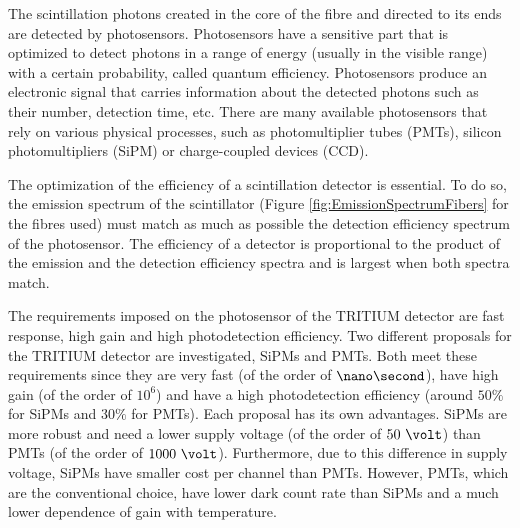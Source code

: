 The scintillation photons created in the core of the fibre and directed to its ends are detected by photosensors. Photosensors have a sensitive part that is optimized to detect photons in a range of energy (usually in the visible range) with a certain probability, called quantum efficiency. Photosensors produce an electronic signal that carries information about the detected photons such as their number, detection time, etc. There are many available photosensors that rely on various physical processes, such as photomultiplier tubes (PMTs), silicon photomultipliers (SiPM) or charge-coupled devices (CCD).  %

The optimization of the efficiency of a scintillation detector is essential. To do so, the emission spectrum of the scintillator (Figure \ref{fig:EmissionSpectrumFibers} for the fibres used) must match as much as possible the detection efficiency spectrum of the photosensor. The efficiency of a detector is proportional to the product of the emission and the detection efficiency spectra and is largest when both spectra match.

The requirements imposed on the photosensor of the TRITIUM detector are fast response, high gain and high photodetection efficiency. Two different proposals for the TRITIUM detector are investigated, SiPMs and PMTs. Both meet these requirements since they are very fast (of the order of $\nano\second$), have high gain (of the order of $10^{6}$) and have a high photodetection efficiency (around $50\%$ for SiPMs and $30\%$ for PMTs). Each proposal has its own advantages. SiPMs are more robust and need a lower supply voltage (of the order of $50~\volt$) than PMTs (of the order of $1000~\volt$). Furthermore, due to this difference in supply voltage, SiPMs have smaller cost per channel than PMTs. However, PMTs, which are the conventional choice, have lower dark count rate than SiPMs and a much lower dependence of gain with temperature.


